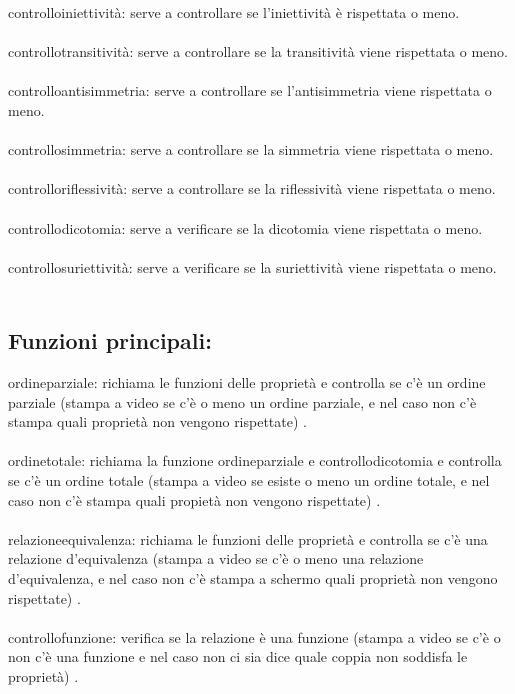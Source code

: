 \documentclass[11pt, a4paper, titlepage, block]{article}
\begin{document}
	controllo\textunderscore iniettivit\`a: serve a controllare se l'iniettivit\`a \`e rispettata o meno.\\
	\\
	controllo\textunderscore transitivit\`a: serve a controllare se la transitivit\`a 
	viene rispettata o meno.\\
	\\
	controllo\textunderscore antisimmetria: serve a controllare se l'antisimmetria viene rispettata o meno.\\
	\\
	controllo\textunderscore simmetria: serve a controllare se la simmetria viene rispettata o meno.\\
	\\
	controllo\textunderscore riflessivit\`a: serve a controllare se la riflessivit\`a viene rispettata o meno.\\
	\\
	controllo\textunderscore dicotomia: serve a verificare se la dicotomia viene rispettata o meno.\\
	\\
	controllo\textunderscore suriettivit\`a: serve a verificare se la suriettivit\`a viene rispettata o meno.\\
	\\
	\newpage
	\subsection{Funzioni principali:}
	ordine\textunderscore parziale: richiama le funzioni delle propriet\`a e controlla se c'\`e un ordine parziale (stampa a video se c'\`e o meno un ordine parziale, e nel caso non c'\`e stampa quali propriet\`a non vengono rispettate) .\\
	\\
	ordine\textunderscore totale: richiama la funzione ordine\textunderscore parziale e controllo\textunderscore dicotomia e controlla se c'\`e un ordine totale (stampa a video se esiste o meno un ordine totale, e nel caso non c'\`e stampa quali propiet\`a non vengono rispettate) .\\
	\\
	relazione\textunderscore equivalenza: richiama le funzioni delle propriet\`a e controlla se c'\`e una relazione d'equivalenza (stampa a video se c'\`e o meno una relazione d'equivalenza, e nel caso non c'\`e stampa a schermo quali propriet\`a non vengono rispettate) .\\
	\\
	controllo\textunderscore funzione: verifica se la relazione \`e una funzione (stampa a video se c'\`e o non c'\`e una funzione e nel caso non ci sia dice quale coppia non soddisfa le propriet\`a) .\\
	\\
	\newpage 
\end{document}
